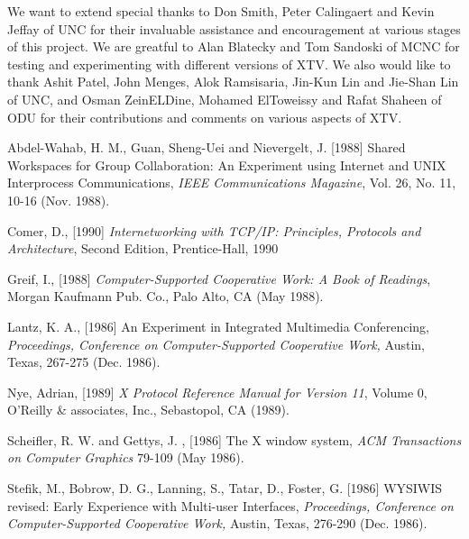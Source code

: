 We want to extend special thanks to Don Smith, Peter Calingaert
and Kevin Jeffay of UNC for their invaluable assistance and encouragement
at various stages of this project. 
We are greatful to Alan Blatecky and Tom Sandoski of MCNC for testing and 
experimenting with different versions of XTV.
We also would like to thank Ashit Patel, John Menges, Alok Ramsisaria,
Jin-Kun Lin and Jie-Shan Lin of UNC, and
Osman ZeinELDine, Mohamed ElToweissy  and Rafat Shaheen of ODU
for their contributions and comments on various aspects of XTV.
\newpage
%
%
\begin{thebibliography}{}

Abdel-Wahab, H. M., Guan, Sheng-Uei and Nievergelt, J. [1988] Shared
Workspaces for Group Collaboration: An Experiment using Internet and
UNIX Interprocess Communications, {\it IEEE Communications Magazine},
Vol. 26, No. 11, 10-16 (Nov. 1988).

Comer, D., [1990] {\it Internetworking with TCP/IP: Principles, Protocols and
Architecture}, Second Edition, Prentice-Hall, 1990

Greif, I., [1988] {\it Computer-Supported Cooperative Work: A Book of Readings},
Morgan Kaufmann Pub. Co., Palo Alto, CA (May 1988).

Lantz, K. A., [1986] An Experiment in Integrated Multimedia Conferencing,
{\it Proceedings, Conference on Computer-Supported Cooperative Work,}
Austin, Texas, 267-275 (Dec. 1986).

Nye, Adrian, [1989] {\it X Protocol Reference Manual for Version 11},  Volume 0,
O'Reilly \& associates, Inc., Sebastopol, CA (1989).

Scheifler, R. W. and Gettys, J. , [1986] The X window system, {\it ACM
Transactions on Computer Graphics} 79-109 (May 1986).

Stefik, M., Bobrow, D. G., Lanning, S., Tatar, D., Foster, G. [1986] WYSIWIS
revised: Early Experience with Multi-user Interfaces, {\it
Proceedings, Conference on Computer-Supported Cooperative Work,}
Austin, Texas, 276-290 (Dec. 1986).

\end{thebibliography}

